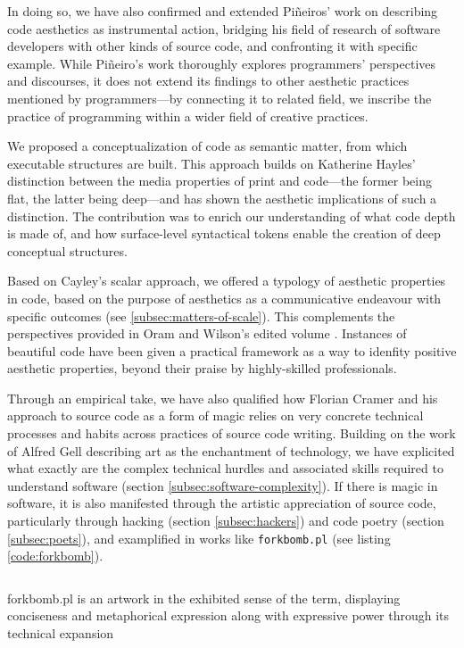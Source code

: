 In doing so, we have also confirmed and extended Piñeiros' work on describing code aesthetics as instrumental action, bridging his field of research of software developers with other kinds of source code, and confronting it with specific example. While Piñeiro's work thoroughly explores programmers' perspectives and discourses, it does not extend its findings to other aesthetic practices mentioned by programmers—by connecting it to related field, we inscribe the practice of programming within a wider field of creative practices.

We proposed a conceptualization of code as semantic matter, from which executable structures are built. This approach builds on Katherine Hayles' distinction between the media properties of print and code—the former being flat, the latter being deep—and has shown the aesthetic implications of such a distinction. The contribution was to enrich our understanding of what code depth is made of, and how surface-level syntactical tokens enable the creation of deep conceptual structures.

Based on Cayley's scalar approach, we offered a typology of aesthetic properties in code, based on the purpose of aesthetics as a communicative endeavour with specific outcomes (see \ref{subsec:matters-of-scale}). This complements the perspectives provided in Oram and Wilson's edited volume \citep{oram_beautiful_2007}. Instances of beautiful code have been given a practical framework as a way to idenfity positive aesthetic properties, beyond their praise by highly-skilled professionals.

Through an empirical take, we have also qualified how Florian Cramer and his approach to source code as a form of magic relies on very concrete technical processes and habits across practices of source code writing. Building on the work of Alfred Gell describing art as the enchantment of technology, we have explicited what exactly are the complex technical hurdles and associated skills required to understand software (section \ref{subsec:software-complexity}). If there is magic in software, it is also manifested through the artistic appreciation of source code, particularly through hacking (section \ref{subsec:hackers}) and code poetry (section \ref{subsec:poets}), and examplified in works like \lstinline{forkbomb.pl} (see listing \ref{code:forkbomb}).

\begin{listing}
    \inputminted{perl}{./corpus/forkbomb.pl}
    \caption{forkbomb.pl is an artwork in the exhibited sense of the term, displaying conciseness and metaphorical expression along with expressive power through its technical expansion}
    \label{code:forkbomb}
\end{listing}

